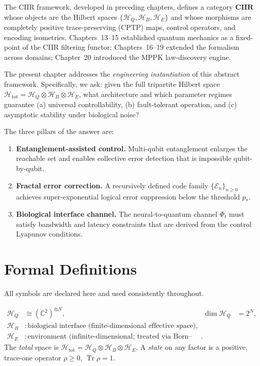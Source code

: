 The CIIR framework, developed in preceding chapters, defines a category
$\mathbf{CIIR}$ whose objects are the Hilbert spaces
$\{\mathcal{H}_Q, \mathcal{H}_B, \mathcal{H}_E\}$ and whose morphisms
are completely positive trace-preserving (CPTP) maps, control
operators, and encoding isometries.  Chapters~13--15 established quantum
mechanics as a fixed-point of the CIIR filtering functor; Chapters~16--19
extended the formalism across domains; Chapter~20 introduced the MPPK
law-discovery engine.

The present chapter addresses the \emph{engineering instantiation}
of this abstract framework.  Specifically, we ask: given the full
tripartite Hilbert space $\mathcal{H}_{\mathrm{tot}} = \mathcal{H}_Q \otimes
\mathcal{H}_B \otimes \mathcal{H}_E$, what architecture and which
parameter regimes guarantee (a) universal controllability, (b)
fault-tolerant operation, and (c) asymptotic stability under biological
noise?

The three pillars of the answer are:
\begin{enumerate}[nosep]
  \item \textbf{Entanglement-assisted control.}  Multi-qubit entanglement
        enlarges the reachable set and enables collective error detection
        that is impossible qubit-by-qubit.
  \item \textbf{Fractal error correction.}  A recursively defined code
        family $\{\mathcal{E}_n\}_{n\geq 0}$ achieves super-exponential
        logical error suppression below the threshold $p_*$.
  \item \textbf{Biological interface channel.}  The neural-to-quantum
        channel $\Phi_t$ must satisfy bandwidth and latency constraints
        that are derived from the control Lyapunov conditions.
\end{enumerate}

\section{Formal Definitions}
\label{sec:ch21-defs}

All symbols are declared here and used consistently throughout.

\begin{definition}\label{def:state-spaces}
\begin{align*}
  \mathcal{H}_Q &\cong (\mathbb{C}^2)^{\otimes N},
    & \dim \mathcal{H}_Q &= 2^N,\\
  \mathcal{H}_B &: \text{biological interface (finite-dimensional effective space)},\\
  \mathcal{H}_E &: \text{environment (infinite-dimensional; treated via Born--Markov
                  approximation)}.
\end{align*}
The \emph{total} space is $\mathcal{H}_{\mathrm{tot}} = \mathcal{H}_Q \otimes
\mathcal{H}_B \otimes \mathcal{H}_E$.  A \emph{state} on any factor is
a positive, trace-one operator $\rho \geq 0$, $\operatorname{Tr}\rho = 1$.
\end{definition}

